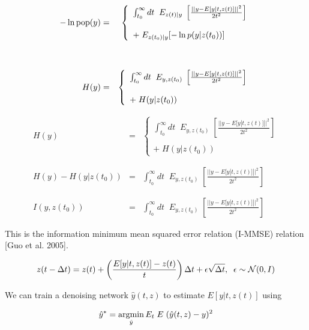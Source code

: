 {\begin{eqnarray*}
- \ln \mathrm{pop}(y) & = & \left\{\begin{array}{l}\int_{t_0}^\infty dt \;\; E_{z(t)|y}\;\left[\frac{||y - E[y|t,z(t)]||^2}{2t^2}\right] \\ \\ + \;E_{z(t_0)|y}[-\ln p(y|z(t_0))]\end{array}\right. \\
\\
\\
  H(y) & = & \left\{\begin{array}{l}\int_{t_0}^\infty dt \;\; E_{y,z(t_0)}\;\left[\frac{||y - E[y|t,z(t)]||^2}{2t^2}\right] \\ \\ +\;H(y|z(t_0))\end{array}\right.
\end{eqnarray*}


{\huge
\begin{eqnarray*}
  H(y) & = & \left\{\begin{array}{l}\int_{t_0}^\infty dt \;\; E_{y,z(t_0)}\;\left[\frac{||y - E[y|t,z(t)]||^2}{2t^2}\right] \\ \\ +\;H(y|z(t_0))\end{array}\right. \\
  \\
  \\
  H(y) - H(y|z(t_0)) & = & \int_{t_0}^\infty dt \;\; E_{y,z(t_0)}\;\left[\frac{||y - E[y|t,z(t)]||^2}{2t^2}\right] \\
  \\
  \\
  I(y,z(t_0)) & = & \int_{t_0}^\infty dt \;\; E_{y,z(t_0)}\;\left[\frac{||y - E[y|t,z(t)]||^2}{2t^2}\right] 
\end{eqnarray*}

\vfill
This is the information minimum mean squared error relation (I-MMSE) relation [Guo et al. 2005].
}


$$z(t - \Delta t) = z(t) + \left(\frac{E[y|t,z(t)] - z(t)}{t}\right)\Delta t + \epsilon\sqrt{\Delta t},\;\;\epsilon \sim {\cal N}(0,I)$$

\vfill
We can train a denoising network $\hat{y}(t,z)$ to estimate $E[y|t,z(t)]$ using

\vfill
$$\hat{y}^* = \operatorname*{argmin}_{\hat{y}} E_t \;E \;(\hat{y}(t,z) - y)^2$$

}
